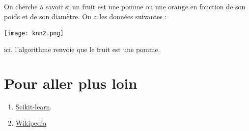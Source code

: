 \documentclass[a0,portrait]{a0poster}
\begin{document}
On cherche à savoir si un fruit est une pomme ou une orange en fonction de son poids et de son diamètre. On a les données suivantes :

\begin{center}\vspace{1cm}
    \texttt{[image: knn2.png]}
\end{center}

ici, l'algorithme renvoie que le fruit est une pomme.


\color{DarkSlateGray} %



\section*{Pour aller plus loin}

\begin{enumerate}
    \item \href{https://scikit-learn.org/stable/auto_examples/linear_model/plot_ols.html}{Scikit-learn}.
    \item \href{https://en.wikipedia.org/wiki/Linear_regression.}{Wikipedia}
\end{enumerate}


\end{document}
